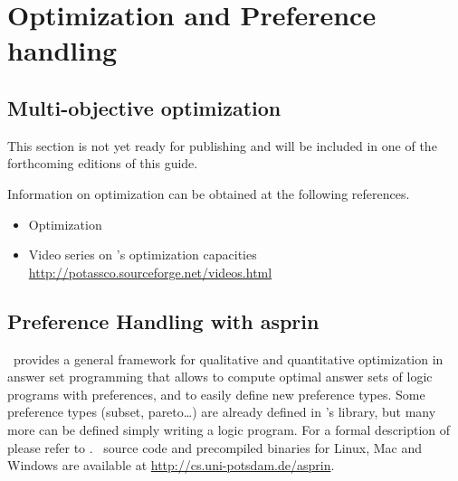 
\section{Optimization and Preference handling}
\label{sec:prefopt}

\subsection{Multi-objective optimization}
\label{sec:oprimization}

This section is not yet ready for publishing
and will be included in one of the forthcoming editions of this guide.

Information on optimization %
can be obtained at the following references.

\begin{itemize}
\item Optimization \cite{gekakasc11b,gekakasc11c,gekasc11b,ankamasc12a}
\item Video series on \clasp's optimization capacities \url{http://potassco.sourceforge.net/videos.html}
\end{itemize}

\subsection{Preference Handling with asprin}

\asprin\ provides a general framework for qualitative and quantitative optimization in
answer set programming
that allows to compute optimal answer sets of logic programs with preferences, and     
to easily define new preference types.
Some preference types (subset, pareto\dots) are already defined in \asprin's library, 
but many more can be defined  simply writing a logic program.  
For a formal description of \asprin\, please refer to \cite{brderosc15a}. 
\asprin\ source code and precompiled binaries for Linux, Mac and Windows are available  
at \url{http://cs.uni-potsdam.de/asprin}.

% 
% 
% 


